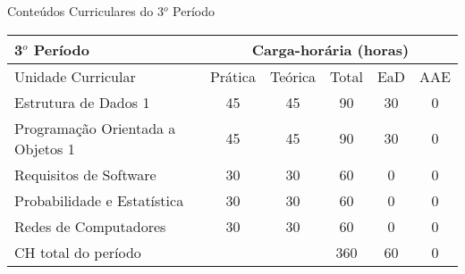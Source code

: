 \begin{quadro}[ht!]
\centering
\caption{Conteúdos Curriculares do 3$^o$ Período}\label{qua:periodo3}
\begin{tabular}{|p{8.0cm}|c|c|c|c|c|}
\hline
\rowcolor{blue1} 3$^o$ Período & \multicolumn{5}{|c|}{\centering Carga-horária (horas)} \\ \hline
\rowcolor{blue1} Unidade Curricular & Prática & Teórica & Total & EaD & AAE \\ \hline
Estrutura de Dados 1 & 45 & 45 & 90 & 30	&	0 \\	\hline
Programação Orientada a Objetos 1  & 45 & 45 & 90 & 30	&	0 \\	\hline
Requisitos de Software & 30 & 30 & 60 & 0	&	0 \\	\hline
Probabilidade e Estatística & 30 & 30 & 60 & 0	&	0 \\	\hline
Redes de Computadores & 30 & 30 & 60 & 0	&	0 \\	\hline
CH total do período & \multicolumn{2}{p{3.3cm}|}{\cellcolor{blue1}} & 360 & 60	&	0 \\ \hline
\end{tabular} \end{quadro}